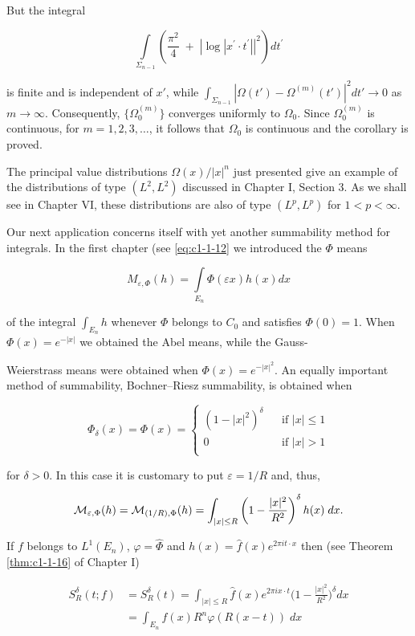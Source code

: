 But the integral

\[
\int\limits_{\Sigma_{n-1}}\left(\frac{\pi^{2}}{4}\;+\;\left|\log|x^{\prime}\cdot t^{\prime}|\right|^{2}\right)d t^{\prime}
\]

is finite and is independent of $x'$, while $\int_{\Sigma_{n-1}}|\Omega(t')-\Omega^{(m)}(t')|^2dt' \to 0$ as $m \to \infty$. Consequently, $\{\Omega_0^{(m)}\}$ converges uniformly to $\Omega_0$. Since $\Omega_0^{(m)}$ is continuous, for $m = 1,2,3,\ldots$, it follows that $\Omega_0$ is continuous and the corollary is proved.

The principal value distributions $\Omega(x)/|x|^n$ just presented give an example of the distributions of type $(L^2, L^2)$ discussed in Chapter I, Section 3. As we shall see in Chapter VI, these distributions are also of type $(L^p, L^p)$ for $1 < p < \infty$.

Our next application concerns itself with yet another summability method for integrals. In the first chapter (see \eqref{eq:c1-1-12} we introduced the $\Phi$ means

\[
M_{\varepsilon,\Phi}(h)=\int\limits_{E_{n}}\Phi(\varepsilon x)h(x)d x
\]

of the integral $\int_{E_n} h$ whenever $\Phi$ belongs to $C_0$ and satisfies $\Phi(0) = 1$. When $\Phi(x) = e^{-|x|}$ we obtained the Abel means, while the Gauss-

Weierstrass means were obtained when $\Phi(x) = e^{-|x|^2}$. An equally important method of summability, Bochner--Riesz summability, is obtained when

\[
\Phi_{\delta}(x)=\Phi(x)=\left\{\begin{matrix}{(1-|x|^{2})^{\delta}}&{}&{\text{if }|x|\leq1}\\ {0}&{}&{\text{if }|x|>1}\\ \end{matrix}\right.
\]

for $\delta > 0$. In this case it is customary to put $\varepsilon = 1/R$ and, thus,

\[
{\cal M}_{\varepsilon,\Phi}(h)={\cal M}_{(1/R),\Phi}(h)=\int_{|x|\leq R}\left(1-\frac{|x|^{2}}{R^{2}}\right)^{\delta}h(x)\;d x.
\]

If $f$ belongs to $L^1(E_n)$, $\varphi = \hat{\Phi}$ and $h(x) = \hat{f}(x)e^{2\pi i t\cdot x}$ then (see Theorem \ref{thm:c1-1-16} of Chapter I)

\[
\begin{aligned}{S_{R}^{\delta}(t;f)}&{{}=S_{R}^{\delta}(t)=\int_{|x|\leq R}\hat{f}(x)e^{2\pi i x\cdot t}\bigg(1-\frac{|x|^{2}}{R^{2}}\bigg)^{\delta}d x}\\ {}&{{}=\int_{E_{n}}f(x)R^{n}\varphi(R(x-t))\;d x}\\ \end{aligned}
\]

